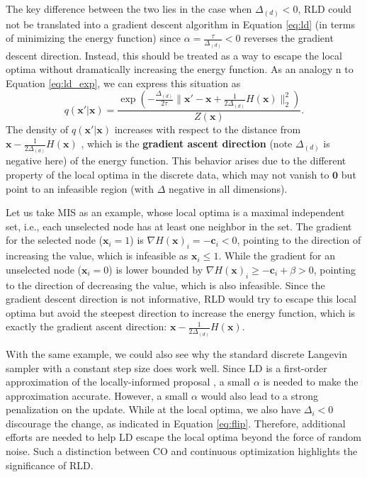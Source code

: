 The key difference between the two lies in the case when $\Delta_{(d)}<0$, RLD could not be translated into a gradient descent algorithm in Equation \ref{eq:ld} (in terms of minimizing the energy function) since $\alpha=\frac{\tau}{\Delta_{(d)}}<0$ reverses the gradient descent direction. Instead, this should be treated as a way to escape the local optima without dramatically increasing the energy function. As an analogy n to Equation \ref{eq:ld_exp}, we can express this situation as
\begin{equation}
    q(\mathbf{x}'|\mathbf{x})=\frac{\exp(-\frac{\Delta_{(d)}}{2\tau}\|\mathbf{x}'-\mathbf{x}+\frac{1}{2\Delta_{(d)}}H(\mathbf{\mathbf{x}})\|_2^2)}{Z(\mathbf{x})}.
\end{equation}
The density of $q(\mathbf{x}'|\mathbf{x})$ increases with respect to the distance from $\mathbf{x}-\frac{1}{2\Delta_{(d)}}H(\mathbf{\mathbf{x}})$ , which is the \textbf{gradient ascent direction} (note $\Delta_{(d)}$ is negative here) of the energy function. This behavior arises due to the different property of the local optima in the discrete data, which may not vanish to $\mathbf{0}$ but point to an infeasible region (with $\Delta$ negative in all dimensions).

Let us take MIS as an example, whose local optima is a maximal independent set, i.e., each unselected node has at least one neighbor in the set. The gradient for the selected node ($\mathbf{x}_i=1$)  is $\nabla H(\mathbf{x})_i=  -\mathbf{c}_i<0$, pointing to the direction of increasing the value, which is infeasible as $\mathbf{x}_i\leq 1$. While the gradient for an unselected node ($\mathbf{x}_i=0$) is lower bounded by $\nabla H(\mathbf{x})_i\geq -\mathbf{c}_i+\beta>0$, pointing to the direction of decreasing the value, which is also infeasible. Since the gradient descent direction is not informative, RLD would try to escape this local optima but avoid the steepest direction to increase the energy function, which is exactly the gradient ascent direction:  $\mathbf{x}-\frac{1}{2\Delta_{(d)}}H(\mathbf{\mathbf{x}})$.  

With the same example, we could also see why the standard discrete Langevin sampler \citep{zhang2022langevinlike} with a constant step size does work well. Since LD is a first-order approximation of the locally-informed proposal \citep{zanella2017informed}, a small $\alpha$ is needed to make the approximation accurate. However, a small $\alpha$ would also lead to a strong penalization on the update.  While at the local optima, we also have $\Delta_i<0$  discourage the change, as indicated in  Equation \ref{eq:flip}. Therefore, additional efforts are needed to help LD escape the local optima beyond the force of random noise. Such a distinction between CO and continuous optimization highlights the significance of RLD.
